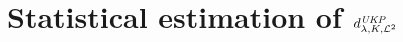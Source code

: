 \documentclass{article} %
\newcommand{\repone}{\phi}
\newcommand{\reptwo}{\psi}
\newcommand{\metricstname}{UKP }
\newcommand{\dtwo}{d_{\lambda,K,\mathcal{L}^{2}}^{\emph{\metricstname}}}
\theoremstyle{plain}
\newcounter{corollarynno}
\newtheorem{corollary}[corollarynno]{Corollary}
\begin{document}





\section{Statistical estimation of $\dtwo$} \label{statistical estimation of UKP}
\end{document}

